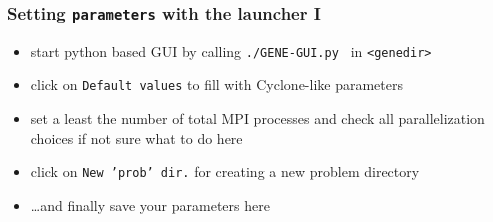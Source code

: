 \documentclass[9pt]{beamer}
\begin{document}
{
\begin{frame}[fragile]
  \frametitle{Setting {\tt parameters} with the launcher I}

\vspace{5.25cm}

\begin{block}{}
\begin{itemize}
\item start python based GUI by calling \verb|./GENE-GUI.py | in {\tt <genedir>}
\item click on {\tt Default values} to fill with Cyclone-like parameters
\item set a least the number of total MPI processes and check all parallelization choices if not sure what to do here
\item click on {\tt New 'prob' dir.} for creating a new problem directory
\item \ldots and finally save your parameters here
\end{itemize}
\end{block}

\end{frame}
}

\end{document}
